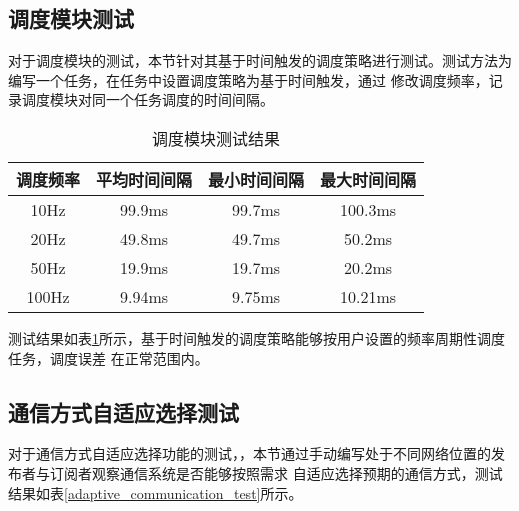 \subsection{调度模块测试}
对于调度模块的测试，本节针对其基于时间触发的调度策略进行测试。测试方法为编写一个任务，在任务中设置调度策略为基于时间触发，通过
修改调度频率，记录调度模块对同一个任务调度的时间间隔。
\begin{table}[H]
  \centering\small
  \renewcommand\arraystretch{1.2}
  \caption{调度模块测试结果}
  \label{scheduler_test_result}
  \begin{tabular}{cccc}
    \toprule
    调度频率 & 平均时间间隔 & 最小时间间隔 & 最大时间间隔\\
    \midrule
    10Hz & 99.9ms & 99.7ms & 100.3ms \\
    20Hz & 49.8ms & 49.7ms & 50.2ms \\
    50Hz & 19.9ms& 19.7ms & 20.2ms \\
    100Hz & 9.94ms& 9.75ms & 10.21ms \\
    \bottomrule
  \end{tabular}
\end{table}
测试结果如表\ref{scheduler_test_result}所示，基于时间触发的调度策略能够按用户设置的频率周期性调度任务，调度误差
在正常范围内。

\subsection{通信方式自适应选择测试}
对于通信方式自适应选择功能的测试，，本节通过手动编写处于不同网络位置的发布者与订阅者观察通信系统是否能够按照需求
自适应选择预期的通信方式，测试结果如表\ref{adaptive_communication_test}所示。


